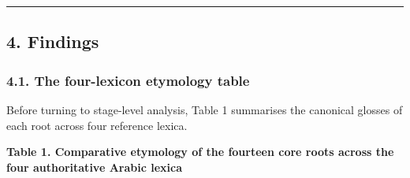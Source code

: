 \begin{center}\rule{0.5\linewidth}{0.5pt}\end{center}

\subsection{4. Findings}\label{findings}

\subsubsection{4.1. The four-lexicon etymology
table}\label{the-four-lexicon-etymology-table}

Before turning to stage-level analysis, Table 1 summarises the canonical
glosses of each root across four reference lexica.

\textbf{Table 1. Comparative etymology of the fourteen core roots across
the four authoritative Arabic lexica}

